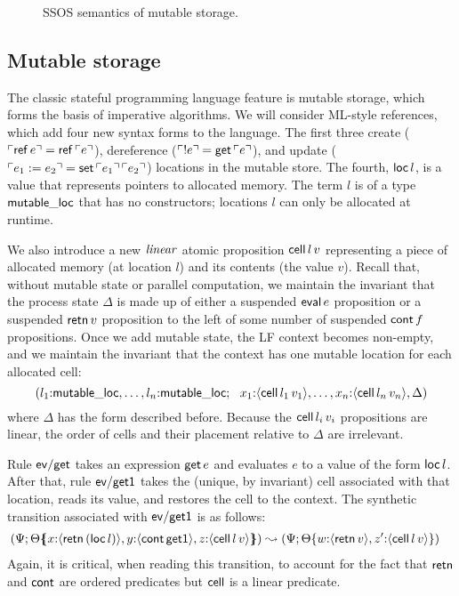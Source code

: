 \begin{figure}[t]
\caption{SSOS semantics of mutable storage.}
\label{fig:ssos-mutable}
\end{figure}

\subsection{Mutable storage}
\label{sec:mutable-storage}

The classic stateful programming language feature is mutable storage,
which forms the basis of imperative algorithms. We will consider
ML-style references, which add four new syntax forms to the language.
The first three create (${\ulcorner{{\sf ref}\,e}\urcorner} = {\sf
  ref}\,{\ulcorner{e}\urcorner}$), dereference (${\ulcorner{{!}e}\urcorner} = {\sf
  get}\,{\ulcorner{e}\urcorner}$), and update (${\ulcorner{e_1 := e_2}\urcorner} = {\sf
  set}\,{\ulcorner{e_1}\urcorner}\,{\ulcorner{e_2}\urcorner}$) locations in the mutable
store. The fourth, ${\sf loc}\,l$, is a value that represents pointers
to allocated memory. The term $l$ is of a type ${\sf mutable\_loc}$
that has no constructors; locations $l$ can only be allocated at
runtime.

We also introduce a new ${\it linear}$ atomic proposition ${\sf
  cell}\,l\,v$ representing a piece of allocated memory (at location
$l$) and its contents (the value $v$). Recall that, without mutable
state or parallel computation, we maintain the invariant that the
process state $\Delta$ is made up of either a suspended ${\sf eval}\,e$
proposition or a suspended ${\sf retn}\,v$ proposition to the left of
some number of suspended ${\sf cont}\,f$ propositions. Once we add
mutable state, the LF context becomes non-empty, and we maintain the
invariant that the context has one mutable location for each allocated
cell:
\[
(l_1{:}{\sf mutable\_loc}, \ldots, l_n{:}{\sf mutable\_loc}; ~~
 x_1{:}\langle {{\sf cell}\,l_1\,v_1} \rangle, \ldots, 
 x_n{:}\langle {{\sf cell}\,l_n\,v_n} \rangle, 
 \Delta)
\]
where $\Delta$ has the form described before. Because the ${\sf
  cell}\,l_i\,v_i$ propositions are linear, the order of cells and
their placement relative to $\Delta$ are irrelevant.

Rule ${\sf ev/get}$ takes an expression ${\sf get}\,e$ and evaluates 
$e$ to a value of the form ${\sf loc}\,l$. After that, rule
${\sf ev/get1}$ takes the (unique, by invariant) cell associated
with that location, reads its value, and restores the cell to the
context. The synthetic transition associated with ${\sf ev/get1}$ is 
as follows:
\begin{align*}
(\Psi&;  {\Theta}\mbox{$\{\hspace{-4pt}\{$}{x{:}\langle {{\sf retn}\,({\sf loc}\,l)} \rangle, y{:}\langle {{\sf cont}\,{\sf get1}} \rangle, z{:}\langle {{\sf cell}\,l\,v} \rangle}\mbox{$\}\hspace{-4pt}\}$})
\leadsto 
(\Psi; {\Theta}\{{w{:}\langle {{\sf retn}\,v} \rangle,
z'{:}\langle {{\sf cell}\,l\,v} \rangle}\})
\end{align*}
Again, it is critical, when reading this transition, to account for the fact
that ${\sf retn}$ and ${\sf cont}$ are ordered predicates but ${\sf
  cell}$ is a linear predicate.

